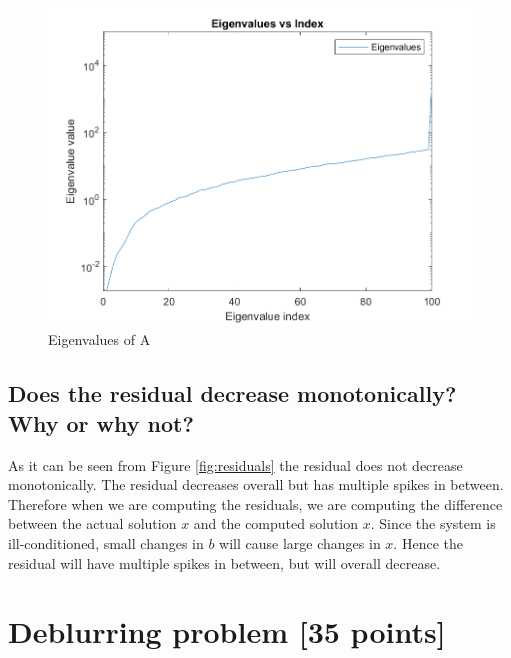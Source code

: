 \documentclass[unicode,11pt,a4paper,oneside,numbers=endperiod,openany]{scrartcl}
\begin{document}
\begin{figure}[H]
    \centering
    \includegraphics[width=0.8\linewidth]{graphs/eigenvalues.png}
    \caption{Eigenvalues of A}
    \label{fig:eigenvalues}
\end{figure}

\subsection{Does the residual decrease monotonically? Why or why not?}
As it can be seen from Figure \ref{fig:residuals} the residual does not decrease monotonically. The residual decreases overall but has multiple spikes in between. Therefore when we are computing the residuals, we are computing the difference between the actual solution $x$ and the computed solution $x$. Since the system is ill-conditioned, small changes in $b$ will cause large changes in $x$. Hence the residual will have multiple spikes in between, but will overall decrease.


\section{Deblurring problem [35 points]}
\end{document}
